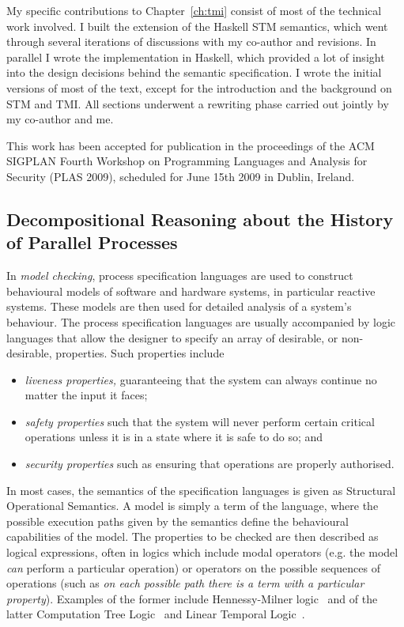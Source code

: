 My specific contributions to Chapter~\ref{ch:tmi} consist of most of the technical
work involved. I built the extension of the Haskell STM semantics, which went
through several iterations of discussions with my co-author and revisions. In
parallel I wrote the implementation in Haskell, which provided a lot of insight
into the design decisions behind the semantic specification. I wrote the initial
versions of most of the text, except for the introduction and the background on
STM and TMI. All sections underwent a rewriting phase carried out jointly by
my co-author and me.

This work has been accepted for publication in the proceedings of
the ACM SIGPLAN Fourth Workshop on Programming
Languages and Analysis for Security (PLAS 2009), 
scheduled for June 15th 2009 in Dublin, Ireland.


\subsection{Decompositional Reasoning about the History of Parallel Processes} %

In \emph{model checking}, process specification languages are used to construct
behavioural models of software and hardware systems, in particular reactive
systems. These models are then used
for detailed analysis of a system's behaviour. The process specification languages
are usually accompanied by logic languages that allow the designer to specify an
array of desirable, or non-desirable, properties. Such properties include 
\begin{itemize}
    \item \emph{liveness properties,} guaranteeing that the system can always 
    continue no matter the input it faces;
    \item \emph{safety properties} such that the system will never perform certain critical
    operations unless it is in a state where it is safe to do so; and
    \item \emph{security properties} such as ensuring that operations are properly authorised.
\end{itemize}

In most cases, the semantics of the specification languages is given as Structural
Operational Semantics. A model is simply a term of the language, where the possible
execution paths given by the semantics define the behavioural capabilities of
the model. The properties to be checked are then described as logical expressions,
often in logics which include modal operators (e.g. the model \emph{can} perform
a particular operation) or operators on the possible sequences of operations (such
as \emph{on each possible path there is a term with a particular property}).
Examples of the former include Hennessy-Milner logic~\cite{Hennessy85} 
and of the latter Computation Tree Logic~\cite{CE81} and Linear Temporal
Logic~\cite{Pnueli77}.

